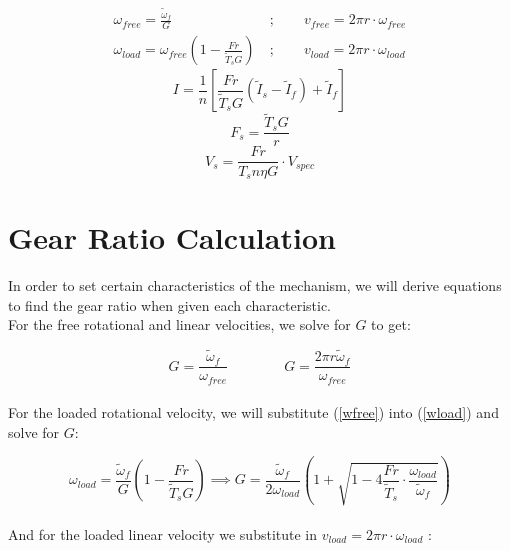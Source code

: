 \documentclass[a4paper]{article}
\begin{document}
	\begin{align}
		\omega_{free} = \frac{\widetilde{\omega}_f}{G}\ &; \qquad v_{free} = 2\pi r \cdot \omega_{free} \label{wfree} \\
		\omega_{load} = \omega_{free} \left( 1 - \frac{F r}{\widetilde{T}_s G} \right)\ &; \qquad v_{load} = 2\pi r \cdot \omega_{load} \label{wload}
	\end{align}
	\begin{equation} \label{current}
		I = \frac{1}{n} \left[ \frac{F r}{\widetilde{T}_s G} \left( \widetilde{I}_s - \widetilde{I}_f \right) + \widetilde{I}_f \right]
	\end{equation}
	\begin{equation} \label{Fs}
		F_s = \frac{\widetilde{T}_s G}{r}
	\end{equation}
	\begin{equation} \label{Vs}
		V_s = \frac{F r}{T_s n \eta G} \cdot V_{spec}
	\end{equation}
	
	\vspace{3mm}
	\section*{Gear Ratio Calculation}
	
	In order to set certain characteristics of the mechanism, we will derive equations to find the gear ratio when given each characteristic.\\
	
	\newpage
	For the free rotational and linear velocities, we solve for $ G $ to get:
	
	\begin{equation}
		G = \frac{\widetilde{\omega}_f}{\omega_{free}} \qquad\qquad G = \frac{2\pi r \widetilde{\omega}_f}{\omega_{free}}
	\end{equation}
	\\
	For the loaded rotational velocity, we will substitute (\ref{wfree}) into (\ref{wload}) and solve for $ G $:
	
	\begin{equation}
		\omega_{load} = \frac{\widetilde{\omega}_f}{G} \left( 1 - \frac{F r}{\widetilde{T}_s G} \right) \implies
		G = \frac{\widetilde{\omega}_f}{2 \omega_{load}} \left( 1 + \sqrt{1 - 4 \frac{F r}{\widetilde{T}_s} \cdot \frac{\omega_{load}}{\widetilde{\omega}_f}} \right)
	\end{equation}
	\\
	And for the loaded linear velocity we substitute in $ v_{load} = 2\pi r \cdot \omega_{load} $ :
	
\end{document}
